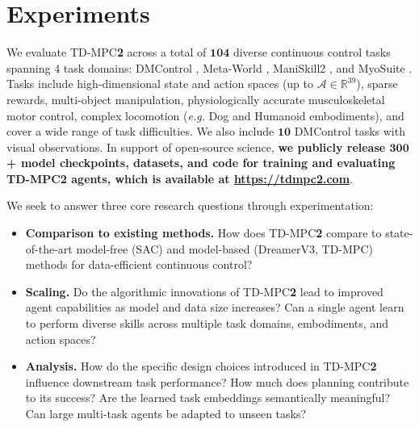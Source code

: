\documentclass{article}
\begin{document}
\vspace{-0.025in}
\section{Experiments}
\label{sec:experiments}
\vspace{-0.025in}
We evaluate TD-MPC\textbf{2} across a total of $\mathbf{104}$ diverse continuous control tasks spanning 4 task domains: DMControl \citep{deepmindcontrolsuite2018}, Meta-World \citep{yu2019meta}, ManiSkill2 \citep{gu2023maniskill2}, and MyoSuite \citep{MyoSuite2022}. Tasks include high-dimensional state and action spaces (up to $\mathcal{A} \in \mathbb{R}^{39}$), sparse rewards, multi-object manipulation, physiologically accurate musculoskeletal motor control, complex locomotion (\emph{e.g.} Dog and Humanoid embodiments), and cover a wide range of task difficulties. We also include $\mathbf{10}$ DMControl tasks with visual observations. In support of open-source science, \textbf{we publicly release $\mathbf{300}$+ model checkpoints, datasets, and code for training and evaluating TD-MPC\textbf{2} agents, which is available at \url{https://tdmpc2.com}}.

We seek to answer three core research questions through experimentation:
\begin{itemize}[leftmargin=0.2in]
    \item \vspace{-0.1in} \textbf{Comparison to existing methods.} How does TD-MPC\textbf{2} compare to state-of-the-art model-free (SAC) and model-based (DreamerV3, TD-MPC) methods for data-efficient continuous control?
    \item \vspace{-0.04in} \textbf{Scaling.} Do the algorithmic innovations of TD-MPC\textbf{2} lead to improved agent capabilities as model and data size increases? Can a single agent learn to perform diverse skills across multiple task domains, embodiments, and action spaces?
    \item \vspace{-0.04in} \textbf{Analysis.} How do the specific design choices introduced in TD-MPC\textbf{2} influence downstream task performance? How much does planning contribute to its success? Are the learned task embeddings semantically meaningful? Can large multi-task agents be adapted to unseen tasks?
\end{itemize}
\end{document}
